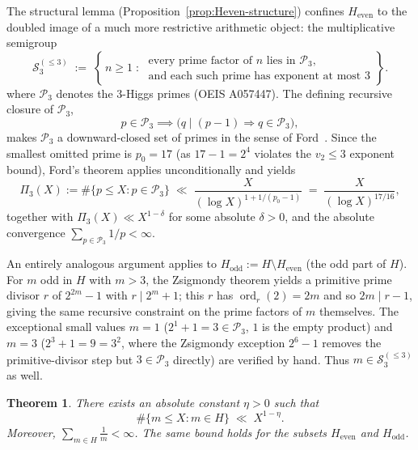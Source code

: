 \documentclass[11pt]{amsart}
\theoremstyle{plain}
\newtheorem{theorem}{Theorem}
\theoremstyle{definition}
\begin{document}
The structural lemma (Proposition~\ref{prop:Heven-structure}) confines
$H_{\mathrm{even}}$ to the doubled image of a much more restrictive
arithmetic object: the multiplicative semigroup
\[
\mathcal{S}_3^{(\le 3)}
\;:=\;
\left\{\, n \ge 1 \;:\;
\begin{array}{l}
\text{every prime factor of } n \text{ lies in } \mathcal{P}_3,\\
\text{and each such prime has exponent at most } 3
\end{array}
\right\}.
\]
where $\mathcal{P}_3$ denotes the 3-Higgs primes (OEIS A057447). The
defining recursive closure of $\mathcal{P}_3$,
\[
p \in \mathcal{P}_3 \implies \bigl(q \mid (p-1) \Rightarrow q \in \mathcal{P}_3\bigr),
\]
makes $\mathcal{P}_3$ a downward-closed set of primes in the sense of
Ford~\cite{Ford2014}. Since the smallest omitted prime is $p_0 = 17$
(as $17 - 1 = 2^4$ violates the $v_2 \le 3$ exponent bound), Ford's
theorem applies unconditionally and yields
\begin{equation}\label{eq:ford-bound}
\Pi_3(X) := \#\{p \le X : p \in \mathcal{P}_3\}
\;\ll\; \frac{X}{(\log X)^{1 + 1/(p_0 - 1)}}
\;=\; \frac{X}{(\log X)^{17/16}},
\end{equation}
together with $\Pi_3(X) \ll X^{1-\delta}$ for some absolute
$\delta > 0$, and the absolute convergence
$\sum_{p \in \mathcal{P}_3} 1/p < \infty$.

An entirely analogous argument applies to $H_{\mathrm{odd}} := H
\setminus H_{\mathrm{even}}$ (the odd part of $H$). For $m$ odd in
$H$ with $m > 3$, the Zsigmondy theorem yields a primitive prime
divisor $r$ of $2^{2m}-1$ with $r \mid 2^m+1$; this $r$ has
$\operatorname{ord}_r(2) = 2m$ and so $2m \mid r-1$, giving the
same recursive constraint on the prime factors of $m$ themselves.
The exceptional small values $m = 1$ ($2^1+1 = 3 \in \mathcal{P}_3$,
$1$ is the empty product) and $m = 3$ ($2^3+1 = 9 = 3^2$, where the
Zsigmondy exception $2^6 - 1$ removes the primitive-divisor step but
$3 \in \mathcal{P}_3$ directly) are verified by hand. Thus
$m \in \mathcal{S}_3^{(\le 3)}$ as well.

\begin{theorem}\label{thm:H-thin}
There exists an absolute constant $\eta > 0$ such that
\[
\#\{m \le X : m \in H\} \;\ll\; X^{1-\eta}.
\]
Moreover, $\displaystyle\sum_{m \in H} \frac{1}{m} < \infty$.
The same bound holds for the subsets $H_{\mathrm{even}}$ and
$H_{\mathrm{odd}}$.
\end{theorem}
\end{document}
